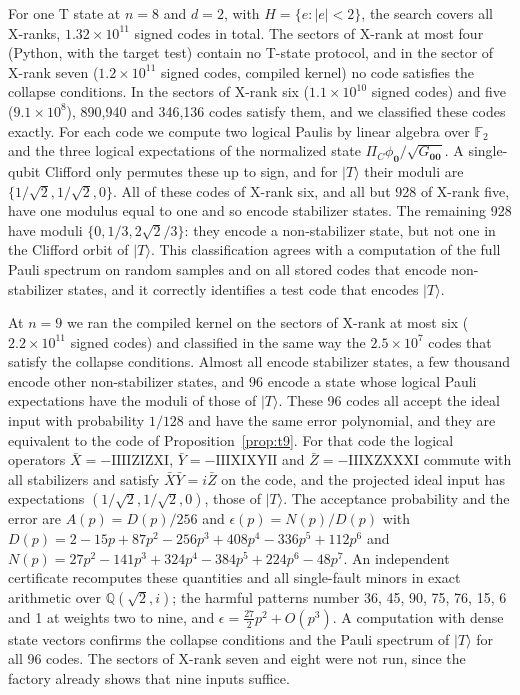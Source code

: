 \documentclass[aps,prl,reprint,twocolumn,amsmath,amssymb,floatfix,nofootinbib,superscriptaddress]{revtex4-2}
\newcommand{\F}{\mathbb F_2}
\begin{document}
For one T state at $n=8$ and $d=2$, with $H=\{e:|e|<2\}$, the search covers all X-ranks, $1.32\times10^{11}$ signed codes in total. The sectors of X-rank at most four (Python, with the target test) contain no T-state protocol, and in the sector of X-rank seven ($1.2\times10^{11}$ signed codes, compiled kernel) no code satisfies the collapse conditions. In the sectors of X-rank six ($1.1\times10^{10}$ signed codes) and five ($9.1\times10^{8}$), 890{,}940 and 346{,}136 codes satisfy them, and we classified these codes exactly. For each code we compute two logical Paulis by linear algebra over $\F$ and the three logical expectations of the normalized state $\Pi_C\phi_{\mathbf0}/\sqrt{G_{\mathbf0\mathbf0}}$. A single-qubit Clifford only permutes these up to sign, and for $|T\rangle$ their moduli are $\{1/\sqrt2,1/\sqrt2,0\}$. All of these codes of X-rank six, and all but 928 of X-rank five, have one modulus equal to one and so encode stabilizer states. The remaining 928 have moduli $\{0,1/3,2\sqrt2/3\}$: they encode a non-stabilizer state, but not one in the Clifford orbit of $|T\rangle$. This classification agrees with a computation of the full Pauli spectrum on random samples and on all stored codes that encode non-stabilizer states, and it correctly identifies a test code that encodes $|T\rangle$.

At $n=9$ we ran the compiled kernel on the sectors of X-rank at most six ($2.2\times10^{11}$ signed codes) and classified in the same way the $2.5\times10^{7}$ codes that satisfy the collapse conditions. Almost all encode stabilizer states, a few thousand encode other non-stabilizer states, and 96 encode a state whose logical Pauli expectations have the moduli of those of $|T\rangle$. These 96 codes all accept the ideal input with probability $1/128$ and have the same error polynomial, and they are equivalent to the code of Proposition~\ref{prop:t9}. For that code the logical operators $\bar X=-\mathrm{IIIIZIZXI}$, $\bar Y=-\mathrm{IIIXIXYII}$ and $\bar Z=-\mathrm{IIIXZXXXI}$ commute with all stabilizers and satisfy $\bar X\bar Y=i\bar Z$ on the code, and the projected ideal input has expectations $(1/\sqrt2,1/\sqrt2,0)$, those of $|T\rangle$. The acceptance probability and the error are $A(p)=D(p)/256$ and $\epsilon(p)=N(p)/D(p)$ with $D(p)=2-15p+87p^2-256p^3+408p^4-336p^5+112p^6$ and $N(p)=27p^2-141p^3+324p^4-384p^5+224p^6-48p^7$. An independent certificate recomputes these quantities and all single-fault minors in exact arithmetic over $\mathbb Q(\sqrt2,i)$; the harmful patterns number 36, 45, 90, 75, 76, 15, 6 and 1 at weights two to nine, and $\epsilon=\tfrac{27}{2}p^2+O(p^3)$. A computation with dense state vectors confirms the collapse conditions and the Pauli spectrum of $|T\rangle$ for all 96 codes. The sectors of X-rank seven and eight were not run, since the factory already shows that nine inputs suffice.
\end{document}
